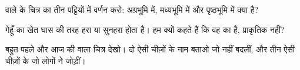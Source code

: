 \begin{exercise}[$\star\star$]\label{exo:g1:landscapes-around-us:9}
 वाले  के चित्र का तीन पट्टियों में वर्णन करो: अग्रभूमि में,
मध्यभूमि में और पृष्ठभूमि में क्या है?
\end{exercise}

\begin{exercise}[$\star\star$]\label{exo:g1:landscapes-around-us:10}
गेहूँ का खेत घास की तरह हरा या सुनहरा होता है। हम क्यों कहते हैं कि वह
 का  है, प्राकृतिक नहीं?
\end{exercise}

\begin{exercise}[$\star\star$]\label{exo:g1:landscapes-around-us:11}
बहुत पहले और आज की  वाला चित्र देखो। दो ऐसी चीज़ों के नाम बताओ जो
नहीं बदलीं, और तीन ऐसी चीज़ों के जो लोगों ने जोड़ीं।
\end{exercise}

